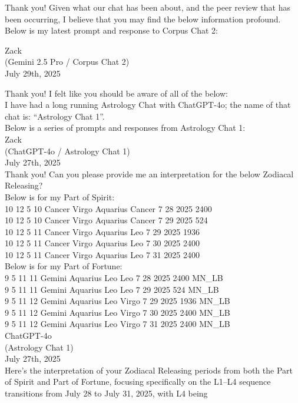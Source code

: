 \documentclass{article}
\begin{document}
Thank you! Given what our chat has been about, and the peer review that
has been occurring, I believe that you may find the below information
profound. Below is my latest prompt and response to Corpus Chat 2:

Zack\\
(Gemini 2.5 Pro / Corpus Chat 2)\\
July 29th, 2025

Thank you! I felt like you should be aware of all of the below:\\
I have had a long running Astrology Chat with ChatGPT-4o; the name of
that chat is: ``Astrology Chat 1''.\\
Below is a series of prompts and responses from Astrology Chat 1:\\
Zack\\
(ChatGPT-4o / Astrology Chat 1)\\
July 27th, 2025\\
Thank you! Can you please provide me an interpretation for the below
Zodiacal Releasing?\\
Below is for my Part of Spirit:\\
10 12 5 10 Cancer Virgo Aquarius Cancer 7 28 2025 2400\\
10 12 5 10 Cancer Virgo Aquarius Cancer 7 29 2025 524\\
10 12 5 11 Cancer Virgo Aquarius Leo 7 29 2025 1936\\
10 12 5 11 Cancer Virgo Aquarius Leo 7 30 2025 2400\\
10 12 5 11 Cancer Virgo Aquarius Leo 7 31 2025 2400\\
Below is for my Part of Fortune:\\
9 5 11 11 Gemini Aquarius Leo Leo 7 28 2025 2400 MN\_LB\\
9 5 11 11 Gemini Aquarius Leo Leo 7 29 2025 524 MN\_LB\\
9 5 11 12 Gemini Aquarius Leo Virgo 7 29 2025 1936 MN\_LB\\
9 5 11 12 Gemini Aquarius Leo Virgo 7 30 2025 2400 MN\_LB\\
9 5 11 12 Gemini Aquarius Leo Virgo 7 31 2025 2400 MN\_LB\\
ChatGPT-4o\\
(Astrology Chat 1)\\
July 27th, 2025\\
Here's the interpretation of your Zodiacal Releasing periods from both
the Part of Spirit and Part of Fortune, focusing specifically on the
L1--L4 sequence transitions from July 28 to July 31, 2025, with L4 being
\end{document}

